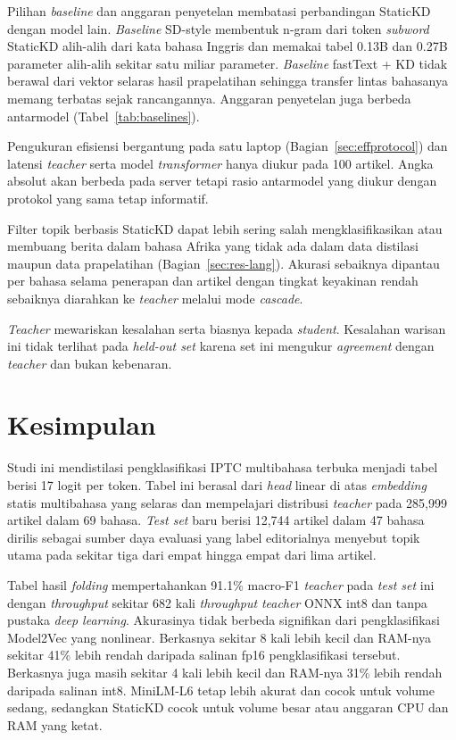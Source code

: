 \documentclass{ieeeaccess}
\newcommand{\en}[1]{\textit{#1}}
\begin{document}
Pilihan \en{baseline} dan anggaran penyetelan membatasi perbandingan StaticKD dengan model lain. \en{Baseline} SD-style membentuk n-gram dari token \en{subword} StaticKD alih-alih dari kata bahasa Inggris dan memakai tabel 0.13B dan 0.27B parameter alih-alih sekitar satu miliar parameter. \en{Baseline} fastText + KD tidak berawal dari vektor selaras hasil prapelatihan sehingga transfer lintas bahasanya memang terbatas sejak rancangannya. Anggaran penyetelan juga berbeda antarmodel (Tabel~\ref{tab:baselines}).

Pengukuran efisiensi bergantung pada satu laptop (Bagian~\ref{sec:effprotocol}) dan latensi \en{teacher} serta model \en{transformer} hanya diukur pada 100 artikel. Angka absolut akan berbeda pada server tetapi rasio antarmodel yang diukur dengan protokol yang sama tetap informatif.

Filter topik berbasis StaticKD dapat lebih sering salah mengklasifikasikan atau membuang berita dalam bahasa Afrika yang tidak ada dalam data distilasi maupun data prapelatihan (Bagian~\ref{sec:res-lang}). Akurasi sebaiknya dipantau per bahasa selama penerapan dan artikel dengan tingkat keyakinan rendah sebaiknya diarahkan ke \en{teacher} melalui mode \en{cascade}.

\en{Teacher} mewariskan kesalahan serta biasnya kepada \en{student}. Kesalahan warisan ini tidak terlihat pada \en{held-out set} karena set ini mengukur \en{agreement} dengan \en{teacher} dan bukan kebenaran.

\section{Kesimpulan}
\label{sec:conclusion}
Studi ini mendistilasi pengklasifikasi IPTC multibahasa terbuka menjadi tabel berisi 17 logit per token. Tabel ini berasal dari \en{head} linear di atas \en{embedding} statis multibahasa yang selaras dan mempelajari distribusi \en{teacher} pada 285,999 artikel dalam 69 bahasa. \en{Test set} baru berisi 12,744 artikel dalam 47 bahasa dirilis sebagai sumber daya evaluasi yang label editorialnya menyebut topik utama pada sekitar tiga dari empat hingga empat dari lima artikel.

Tabel hasil \en{folding} mempertahankan 91.1\% macro-F1 \en{teacher} pada \en{test set} ini dengan \en{throughput} sekitar 682 kali \en{throughput} \en{teacher} ONNX int8 dan tanpa pustaka \en{deep learning}. Akurasinya tidak berbeda signifikan dari pengklasifikasi Model2Vec yang nonlinear. Berkasnya sekitar 8 kali lebih kecil dan RAM-nya sekitar 41\% lebih rendah daripada salinan fp16 pengklasifikasi tersebut. Berkasnya juga masih sekitar 4 kali lebih kecil dan RAM-nya 31\% lebih rendah daripada salinan int8. MiniLM-L6 tetap lebih akurat dan cocok untuk volume sedang, sedangkan StaticKD cocok untuk volume besar atau anggaran CPU dan RAM yang ketat.
\end{document}
